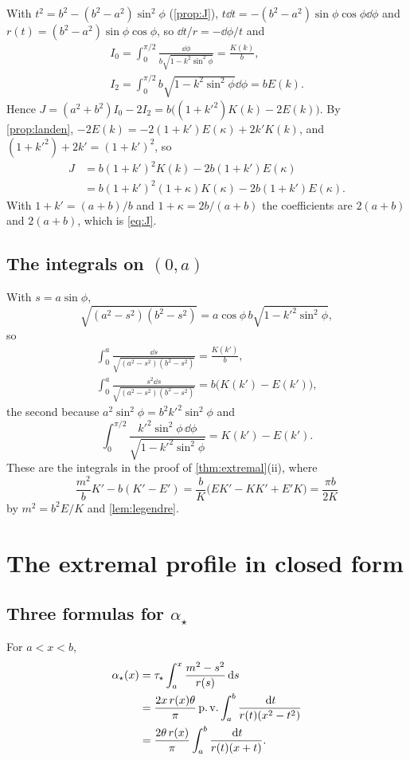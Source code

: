 With $t^2=b^2-(b^2-a^2)\sin^2\phi$ (\cref{prop:J}),
$t\dd t=-(b^2-a^2)\sin\phi\cos\phi\dd\phi$ and $r(t)=(b^2-a^2)\sin\phi\cos\phi$,
so $\dd t/r=-\dd\phi/t$ and
\begin{gather*}
I_0=\int_0^{\pi/2}\frac{\dd\phi}{b\sqrt{1-k^2\sin^2\phi}}=\frac{K(k)}b,\\
I_2=\int_0^{\pi/2}b\sqrt{1-k^2\sin^2\phi}\dd\phi=bE(k).
\end{gather*}
Hence $J=(a^2+b^2)I_0-2I_2=b\big((1+k'^2)K(k)-2E(k)\big)$. By
\cref{prop:landen}, $-2E(k)=-2(1+k')E(\kappa)+2k'K(k)$, and
$(1+k'^2)+2k'=(1+k')^2$, so
\begin{align*}
J&=b(1+k')^2K(k)-2b(1+k')E(\kappa)\\
&=b(1+k')^2(1+\kappa)K(\kappa)-2b(1+k')E(\kappa).
\end{align*}
With $1+k'=(a+b)/b$ and $1+\kappa=2b/(a+b)$ the coefficients are $2(a+b)$
and $2(a+b)$, which is \eqref{eq:J}.

\subsection{The integrals on $(0,a)$}

With $s=a\sin\phi$,
\[
\sqrt{(a^2-s^2)(b^2-s^2)}=a\cos\phi\,b\sqrt{1-k'^2\sin^2\phi},
\]
so
\begin{gather*}
\int_0^a\frac{\dd s}{\sqrt{(a^2-s^2)(b^2-s^2)}}=\frac{K(k')}b,\\
\int_0^a\frac{s^2\dd s}{\sqrt{(a^2-s^2)(b^2-s^2)}}=b\big(K(k')-E(k')\big),
\end{gather*}
the second because $a^2\sin^2\phi=b^2k'^2\sin^2\phi$ and
\[
\int_0^{\pi/2}\frac{k'^2\sin^2\phi\,\dd\phi}{\sqrt{1-k'^2\sin^2\phi}}=K(k')-E(k').
\]
These are
the integrals in the proof of \cref{thm:extremal}(ii), where
\[
\frac{m^2}bK'-b(K'-E')=\frac b{K}\big(EK'-KK'+E'K\big)=\frac{\pi b}{2K}
\]
by $m^2=b^2E/K$ and \cref{lem:legendre}.

\section{The extremal profile in closed form}\label{app:profiles}

\subsection{Three formulas for $\alpha_\star$}

\begin{lemma}\label{lem:alphaforms}
For $a<x<b$,
\begin{align*}
\alpha_\star(x)&=\tau_\star\int_a^x\frac{m^2-s^2}{r(s)}\,\mathrm d s\\
&=\frac{2x\,r(x)\theta}\pi\operatorname{p.v.}\int_a^b\frac{\,\mathrm d t}{r(t)(x^2-t^2)}\\
&=\frac{2\theta\,r(x)}\pi\int_a^b\frac{\,\mathrm d t}{r(t)(x+t)} .
\end{align*}
\end{lemma}

